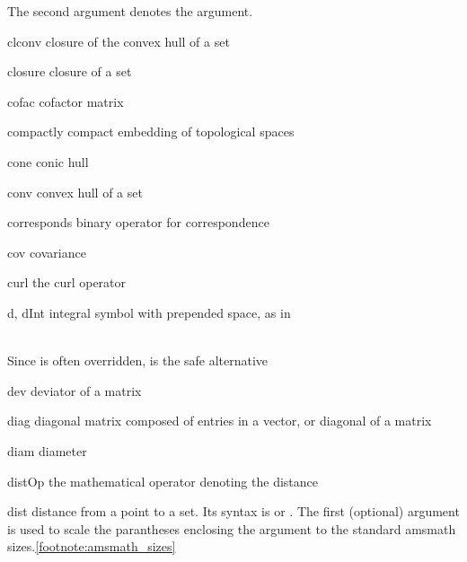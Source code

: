 \documentclass[english,a4paper,DIV=12,parskip=full,oneside]{scrartcl}
\begin{document}
\begin{commandlist}
            The second argument denotes the argument.
            \par{}
            \par{}
        \item[clconv] closure of the convex hull of a set 
        \item[closure] closure of a set 
        \item[cofac] cofactor matrix 
        \item[compactly] compact embedding of topological spaces \mathCodeExample{\compactly}
        \item[cone] conic hull \mathCodeExample{\cone}
        \item[conv] convex hull of a set 
        \item[corresponds] binary operator for correspondence 
        \item[cov] covariance \mathCodeExample{\cov}
        \item[curl] the curl operator \mathCodeExample{\curl}
        \item[d, dInt] integral symbol with prepended space, as in
            \par{}
            \\Since \codeCommand{\d} is often overridden, \codeCommand{\dInt} is the safe alternative
        \item[dev] deviator of a matrix 
        \item[diag] diagonal matrix composed of entries in a vector, or diagonal of a matrix
            \par{}
            \par{}
        \item[diam] diameter 
        \item[distOp] the mathematical operator denoting the distance
            \par\mathCodeExample{\distOp}
        \item[dist] distance from a point to a set.
            Its syntax is  or .
            The first (optional) argument is used to scale the parantheses enclosing the argument to the standard amsmath sizes.\cref{footnote:amsmath_sizes}

\end{commandlist}
\end{document}
